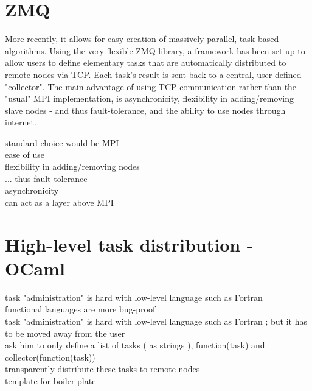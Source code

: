 \documentclass[./thesis.tex]{subfiles}
\begin{document}
\section{ZMQ}
More recently, it allows for easy creation of massively parallel, task-based algorithms.
Using the very flexible ZMQ library, a framework has been set up to allow users to define elementary tasks that are automatically distributed to remote nodes via TCP. Each task's result is sent back to a central, user-defined "collector". The main advantage of using TCP communication rather than the "usual" MPI implementation, is asynchronicity, flexibility in adding/removing slave nodes - and thus fault-tolerance, and the ability to use nodes through internet.


standard choice would be MPI \\
ease of use \\
flexibility in adding/removing nodes \\
... thus fault tolerance \\
asynchronicity \\
can act as a layer above MPI \\
\section{High-level task distribution - OCaml}
task "administration" is hard with low-level language such as Fortran \\
functional languages are more bug-proof \\

task "administration" is hard with low-level language such as Fortran ; but it has to be moved away from the user \\
ask him to only define a list of tasks ( as strings ), function(task) and collector(function(task)) \\
transparently distribute these tasks to remote nodes \\
template for boiler plate \\
\end{document}
